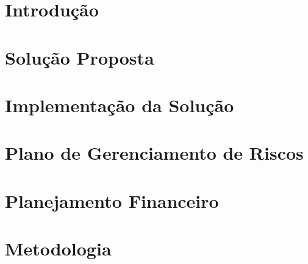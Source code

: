 % 



\chapter{Introdução} %


\chapter{Solução Proposta} %

\label{cha:solucao}


\chapter{Implementação da Solução}

\label{cha:solucao2}

\chapter{Plano de Gerenciamento de Riscos}

\label{cha:riscos}

\chapter{Planejamento Financeiro}


\chapter{Metodologia}

\label{cha:metodologia}
